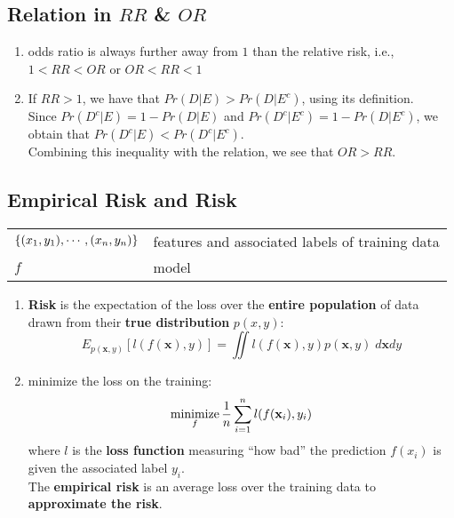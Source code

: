 \subsection*{Relation in $RR$ \& $OR$ \cite{ism-1}}

\begin{enumerate}[itemsep=0.2cm]
    \item odds ratio is always further away from $1$ than the relative risk, i.e., $1 < RR < OR$ or $OR < RR < 1$

    \item If $RR > 1$, we have that $Pr(D|E) > Pr(D|E^c)$, using its definition. \\
    Since $Pr(D^c|E) = 1 - Pr(D|E)$ and $Pr(D^c|E^c) = 1 - Pr(D|E^c)$, we obtain that $Pr(D^c|E) < Pr(D^c|E^c)$.\\
    Combining this inequality with the relation, we see that $OR > RR$.

\end{enumerate}


\subsection{Empirical Risk and Risk \cite{dnn-1}} \label{Empirical Risk and Risk}

\begin{customTableWrapper}{1.5}
\begin{table}[H]
    \centering
    \begin{tabular}{l p{7cm}}
        $\left\{(x_1, y_1), \cdots,(x_n, y_n)\right\}$ & features and associated labels of training data \\

        $f$ & model \\
    \end{tabular}
\end{table}
\end{customTableWrapper}

\begin{enumerate}[itemsep=0.2cm]
    \item \textbf{Risk} is the expectation of the loss over the \textbf{entire population} of data drawn from their \textbf{true distribution} $p(x, y)$:
    \[
        E_{p(\mathbf{x}, y)} [l(f(\mathbf{x}), y)] = \iint l(f(\mathbf{x}), y) p(\mathbf{x}, y) \;d\mathbf{x}dy
    \]
    
    \item minimize the loss on the training: 
    \[
        \displaystyle\mathop{\mathrm{minimize}}_f \dfrac{1}{n} 
        \displaystyle\sum_{i=1}^n l(f(\mathbf{x}_i), y_i)
    \]
    where $l$ is the \textbf{loss function} measuring “how bad” the prediction $f(x_i)$ is given the associated label $y_i$. \\
    The \textbf{empirical risk} is an average loss over the training data to \textbf{approximate the risk}.
    
\end{enumerate}
















